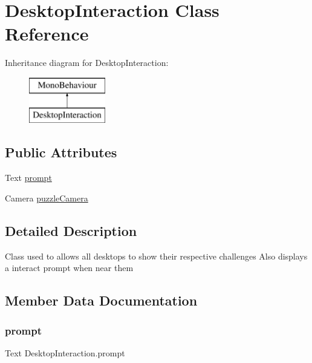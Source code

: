 \hypertarget{class_desktop_interaction}{}\section{Desktop\+Interaction Class Reference}
\label{class_desktop_interaction}
Inheritance diagram for Desktop\+Interaction\+:\begin{figure}[H]
\begin{center}
\leavevmode
\includegraphics[height=2.000000cm]{class_desktop_interaction}
\end{center}
\end{figure}
\subsection*{Public Attributes}
\begin{DoxyCompactItemize}
\item 
Text \hyperlink{class_desktop_interaction_aaaa52b3abff9c12d9608954274d59741}{prompt}
\item 
Camera \hyperlink{class_desktop_interaction_acf4984e2694edc76dd5fa0ca18559d76}{puzzle\+Camera}
\end{DoxyCompactItemize}


\subsection{Detailed Description}
Class used to allows all desktops to show their respective challenges Also displays a interact prompt when near them 

\subsection{Member Data Documentation}
\mbox{\label{class_desktop_interaction_aaaa52b3abff9c12d9608954274d59741}} 
\subsubsection{\texorpdfstring{prompt}{prompt}}
{\footnotesize\ttfamily Text Desktop\+Interaction.\+prompt}

